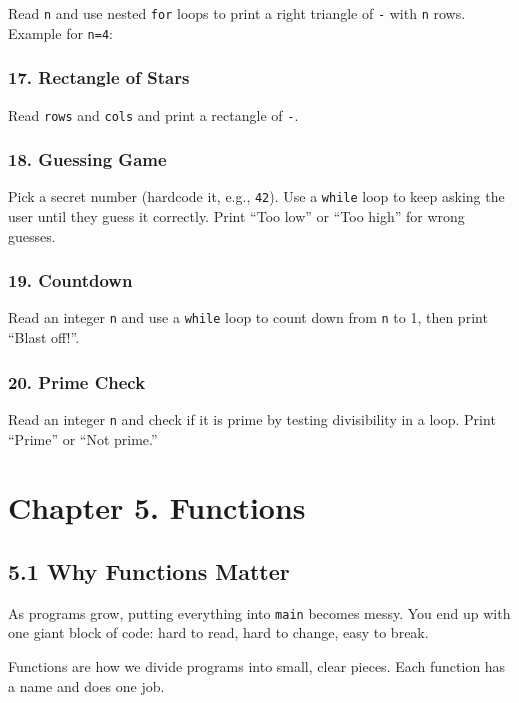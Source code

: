 \documentclass[
  letterpaper,
  DIV=11,
  numbers=noendperiod]{scrreprt}
\begin{document}
Read \texttt{n} and use nested \texttt{for} loops to print a right
triangle of \texttt{-} with \texttt{n} rows. Example for \texttt{n=4}:

\subsubsection{17. Rectangle of Stars}\label{rectangle-of-stars}

Read \texttt{rows} and \texttt{cols} and print a rectangle of
\texttt{-}.

\subsubsection{18. Guessing Game}\label{guessing-game}

Pick a secret number (hardcode it, e.g., \texttt{42}). Use a
\texttt{while} loop to keep asking the user until they guess it
correctly. Print ``Too low'' or ``Too high'' for wrong guesses.

\subsubsection{19. Countdown}\label{countdown}

Read an integer \texttt{n} and use a \texttt{while} loop to count down
from \texttt{n} to 1, then print ``Blast off!''.

\subsubsection{20. Prime Check}\label{prime-check}

Read an integer \texttt{n} and check if it is prime by testing
divisibility in a loop. Print ``Prime'' or ``Not prime.''

\section{Chapter 5. Functions}\label{chapter-5.-functions}

\subsection{5.1 Why Functions Matter}\label{why-functions-matter}

As programs grow, putting everything into \texttt{main} becomes messy.
You end up with one giant block of code: hard to read, hard to change,
easy to break.

Functions are how we divide programs into small, clear pieces. Each
function has a name and does one job.
\end{document}
